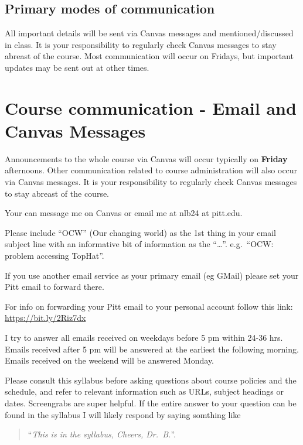 \documentclass[
]{book}
\begin{document}
\hypertarget{primary-modes-of-communication}{%
\section{Primary modes of communication}\label{primary-modes-of-communication}}

All important details will be sent via Canvas messages and mentioned/discussed in class. It is your responsibility to regularly check Canvas messages to stay abreast of the course. Most communication will occur on Fridays, but important updates may be sent out at other times.

\hypertarget{email_and_canvas_msg}{%
\chapter{Course communication - Email and Canvas Messages}\label{email_and_canvas_msg}}

Announcements to the whole course via Canvas will occur typically on \textbf{Friday} afternoons. Other communication related to course administration will also occur via Canvas messages. It is your responsibility to regularly check Canvas messages to stay abreast of the course.

Your can message me on Canvas or email me at nlb24 at pitt.edu.

Please include ``OCW'' (Our changing world) as the 1st thing in your email subject line with an informative bit of information as the ``\ldots{}''. e.g.~``OCW: problem accessing TopHat''.

If you use another email service as your primary email (eg GMail) please set your Pitt email to forward there.

For info on forwarding your Pitt email to your personal account follow this link: \url{https://bit.ly/2Riz7dx}

I try to answer all emails received on weekdays before 5 pm within 24-36 hrs. Emails received after 5 pm will be answered at the earliest the following morning. Emails received on the weekend will be answered Monday.

Please consult this syllabus before asking questions about course policies and the schedule, and refer to relevant information such as URLs, subject headings or dates. Screengrabs are super helpful. If the entire answer to your question can be found in the syllabus I will likely respond by saying somthing like

\begin{quote}
``\emph{This is in the syllabus, Cheers, Dr.~B.}''.
\end{quote}
\end{document}
